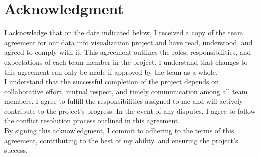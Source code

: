 \documentclass[12pt]{article}
\begin{document}
\section{Acknowledgment}
I acknowledge that on the date indicated below, I received a copy of the team agreement for our data info visualization project and have read, understood, and agreed to comply with it. This agreement outlines the roles, responsibilities, and expectations of each team member in the project. I understand that changes to this agreement can only be made if approved by the team as a whole. \\

I understand that the successful completion of the project depends on collaborative effort, mutual respect, and timely communication among all team members. I agree to fulfill the responsibilities assigned to me and will actively contribute to the project’s progress. In the event of any disputes, I agree to follow the conflict resolution process outlined in this agreement. \\

By signing this acknowledgment, I commit to adhering to the terms of this agreement, contributing to the best of my ability, and ensuring the project's success. \\
\vspace{1cm}
\signField
\signField
\signField
\signField
\newpage
\end{document}
